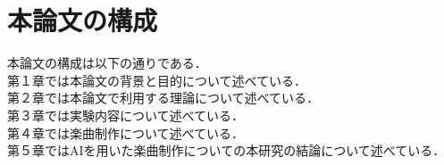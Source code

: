 \section{本論文の構成}
本論文の構成は以下の通りである．\\
第１章では本論文の背景と目的について述べている．\\
第２章では本論文で利用する理論について述べている．\\
第３章では実験内容について述べている．\\
第４章では楽曲制作について述べている．\\
第５章ではAIを用いた楽曲制作についての本研究の結論について述べている．\\
